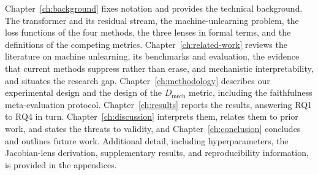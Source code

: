 Chapter~\ref{ch:background} fixes notation and provides the technical background. The transformer and its
residual stream, the machine-unlearning problem, the loss functions of the four methods, the three lenses
in formal terms, and the definitions of the competing metrics. Chapter~\ref{ch:related-work} reviews the
literature on machine unlearning, its benchmarks and evaluation, the evidence that current methods suppress
rather than erase, and mechanistic interpretability, and situates the research gap.
Chapter~\ref{ch:methodology} describes our experimental design and the design of the \(D_\text{mech}\)
metric, including the faithfulness meta-evaluation protocol. Chapter~\ref{ch:results} reports the results,
answering RQ1 to RQ4 in turn. Chapter~\ref{ch:discussion} interprets them, relates them to prior work, and
states the threats to validity, and Chapter~\ref{ch:conclusion} concludes and outlines future work.
Additional detail, including hyperparameters, the Jacobian-lens derivation, supplementary results, and
reproducibility information, is provided in the appendices.
